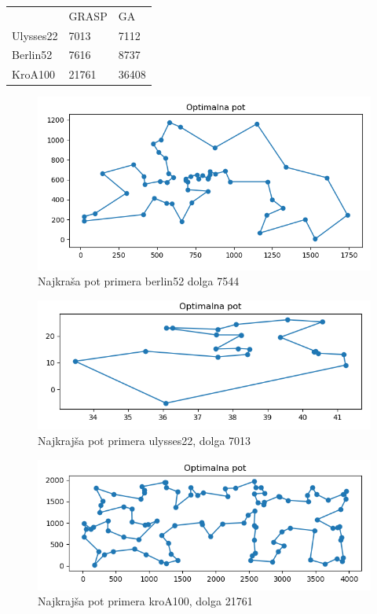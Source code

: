 \documentclass[12pt,a4paper]{amsart}
\theoremstyle{definition} %
\theoremstyle{plain} %
\begin{document}
\begin{table}[h]
\begin{tabular}{lll}
\rowcolor[HTML]{FFCCC9} 
          & GRASP & GA \\
Ulysses22 & 7013  & 7112               \\
Berlin52  & 7616  & 8737               \\
KroA100   & 21761 & 36408             
\end{tabular}
\end{table}

\begin{figure}[h]
\caption{Najkraša pot primera berlin52 dolga 7544}
\centering
\includegraphics[scale =0.5]{berlin_7544}
\end{figure}

\begin{figure}[h]
\caption{Najkrajša pot primera ulysses22, dolga 7013}
\centering
\includegraphics[scale =0.5]{ulysses22_7013}
\end{figure}

\begin{figure}[h]
\caption{Najkrajša pot primera kroA100, dolga 21761}
\centering
\includegraphics[scale =0.5]{kroA100_21761}
\end{figure}
\end{document}
